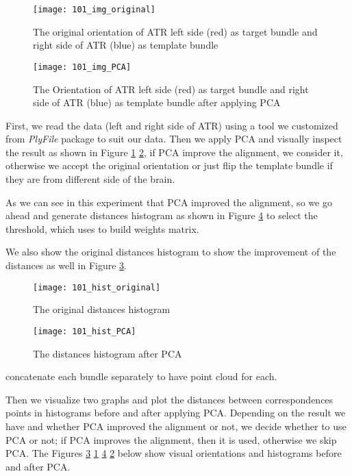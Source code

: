 \documentclass[../structure.tex]{subfiles}
\begin{document}
\begin{figure}[h!]
\centering
\texttt{[image: 101\_img\_original]}
\captionsetup{justification=centering}
\caption{The original orientation of ATR left side (red) as target bundle and right side of ATR (blue) as template bundle}
\label{fig:img_original}
\end{figure}

\begin{figure}[h!]
\centering
\texttt{[image: 101\_img\_PCA]}
\captionsetup{justification=centering}
\caption{The Orientation of ATR left side (red) as target bundle and right side of ATR (blue) as template bundle after applying PCA}
\label{fig:img_PCA}
\end{figure}
\pagebreak

First, we read the data (left and right side of ATR) using a tool we customized from \textit{PlyFile} package to suit our data. Then we apply PCA and visually inspect the result as shown in Figure \ref{fig:img_original} \ref{fig:img_PCA}, if PCA improve the alignment, we consider it, otherwise we accept the original orientation or just flip the template bundle if they are from different side of the brain.

As we can see in this experiment that PCA improved the alignment, so we go ahead and generate distances histogram as shown in Figure \ref{fig:hist_PCA} to select the threshold, which uses to build weights matrix.

We also show the original distances histogram to show the improvement of the distances as well in Figure \ref{fig:hist_original}.

\begin{figure}[h!]
\centering
\texttt{[image: 101\_hist\_original]}
\captionsetup{justification=centering}
\caption{The original distances histogram}
\label{fig:hist_original}
\end{figure}

\begin{figure}[h!]
\centering
\texttt{[image: 101\_hist\_PCA]}
\captionsetup{justification=centering}
\caption{The distances histogram after PCA}
\label{fig:hist_PCA}
\end{figure}


concatenate each bundle separately to have point cloud for each.

Then we visualize two graphs and plot the distances between correspondences points in histograms before and after applying PCA. Depending on the result we have and whether PCA improved the alignment or not, we decide whether to use PCA or not; if PCA improves the alignment, then it is used, otherwise we skip PCA. The Figures \ref{fig:hist_original} \ref{fig:img_original} \ref{fig:hist_PCA} \ref{fig:img_PCA} below show visual orientations and histograms before and after PCA.
\end{document}
